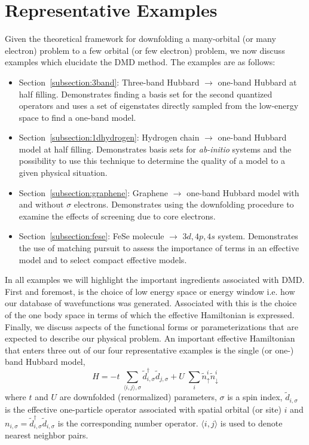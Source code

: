 \section{Representative Examples}
Given the theoretical framework for downfolding a many-orbital (or many electron) problem to a 
few orbital (or few electron) problem, we now discuss examples which elucidate the DMD method. 
The examples are as follows:
\begin{itemize}
\item Section~\ref{subsection:3band}: Three-band Hubbard $\rightarrow$ one-band Hubbard at half filling. Demonstrates finding a basis set for the second quantized operators and uses a set of eigenstates directly sampled from the low-energy space to find a one-band model.
\item Section~\ref{subsection:1dhydrogen}: Hydrogen chain $\rightarrow$ one-band Hubbard model at half filling. Demonstrates basis sets for {\it ab-initio} systems and the possibility to use this technique to determine the quality of a model to a given physical situation.
\item Section~\ref{subsection:graphene}: Graphene $\rightarrow$ one-band Hubbard model with and without $\sigma$ electrons. Demonstrates using the downfolding procedure to examine the effects of screening due to core electrons. 
\item Section~\ref{subsection:fese}: FeSe molecule $\rightarrow$ $3d,4p,4s$ system. Demonstrates the use of matching pursuit to assess the importance of terms in an effective model and to select compact effective models.
\end{itemize}

In all examples we will highlight the important ingredients associated with DMD. First and foremost, is the choice 
of low energy space or energy window i.e. how our database of wavefunctions was generated. Associated with this is 
the choice of the one body space in terms of which the effective Hamiltonian is expressed. Finally, we discuss 
aspects of the functional forms or parameterizations that are expected to describe our physical 
problem. An important effective Hamiltonian that enters three out of our four representative examples is 
the single (or one-) band Hubbard model,
\begin{equation}
	H = -t \;\sum_{\langle i,j \rangle, \sigma} \tilde{d}_{i,\sigma}^{\dagger} \tilde{d}_{j,\sigma} + U \;\sum_{i} \tilde{n}^{i}_{\uparrow} \tilde{n}^{i}_{\downarrow}
\label{eq:oneband}
\end{equation}
where $t$ and $U$ are downfolded (renormalized) parameters, $\sigma$ is a spin index, 
$\tilde{d}_{i,\sigma}$ is the effective one-particle operator associated with spatial orbital (or site) $i$ 
and $n_{i,\sigma}=\tilde{d}_{i,\sigma}^{\dagger} \tilde{d}_{i,\sigma}$ is the corresponding number operator.
$\langle i,j \rangle$ is used to denote nearest neighbor pairs.

